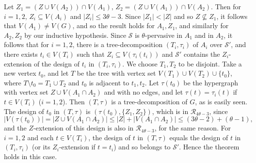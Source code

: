 Let $Z_1 = (Z \cup V(A_2)) \cap V(A_1)$, $Z_2 = (Z \cup V(A_1)) \cap V(A_2)$. Then for $i = 1, 2$, $Z_i \subseteq V(A_i)$ and $|Z_i| \le 3\theta - 3$. Since $|Z_1| < |Z|$ and so $Z \not\subseteq Z_1$, it follows that $V(A_1) \ne V(G)$, and so the result holds for $A_1, Z_1$, and similarly for $A_2, Z_2$ by our inductive hypothesis. Since $\mathscr{S}$ is $\theta$-pervasive in $A_1$ and in $A_2$, it follows that for $i = 1, 2$, there is a tree-decomposition $(T_i, \tau_i)$ of $A_i$ over $\mathscr{S}'$, and there exists $t_i \in V(T_i)$ such that $Z_i \subseteq V(\tau_i(t_i))$ and $\mathscr{S}'$ contains the $Z_i$-extension of the design of $t_i$ in $(T_i, \tau_i)$. We choose $T_1, T_2$ to be disjoint. Take a new vertex $t_0$, and let $T$ be the tree with vertex set $V(T_1) \cup V(T_2) \cup \{t_0\}$, where $T \setminus t_0 = T_1 \cup T_2$ and $t_0$ is adjacent to $t_1, t_2$. Let $\tau(t_0)$ be the hypergraph with vertex set $Z \cup V(A_1 \cap A_2)$ and with no edges, and let $\tau(t) = \tau_i(t)$ if $t \in V(T_i)$ ($i = 1, 2$). Then $(T, \tau)$ is a tree-decomposition of $G$, as is easily seen. The design of $t_0$ in $(T, \tau)$ is $(\tau(t_0), \{Z_1, Z_2\})$, which is in $\mathscr{R}_{4\theta - 3}$, since
\begin{equation*}
|V(\tau(t_0))| = |Z \cup V(A_1 \cap A_2)| \le |Z| + |V(A_1 \cap A_2)| \le (3\theta - 2) + (\theta - 1),
\end{equation*}
and the $Z$-extension of this design is also in $\mathscr{R}_{4\theta - 3}$, for the same reason. For $i = 1, 2$ and each $t \in V(T_i)$, the design of $t$ in $(T, \tau)$ equals the design of $t$ in $(T_i, \tau_i)$ (or its $Z_i$-extension if $t = t_i$) and so belongs to $\mathscr{S}'$. Hence the theorem holds in this case.

